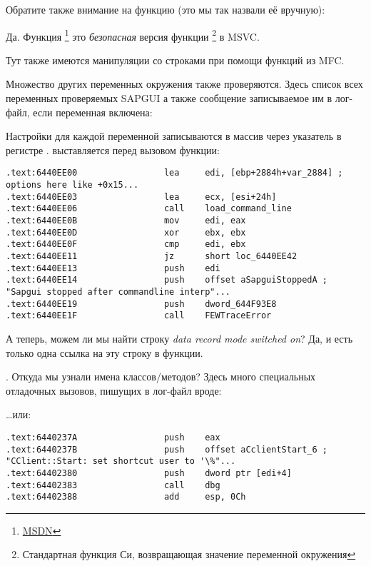 Обратите также внимание на функцию  (это мы так назвали её вручную):



Да. Функция \footnote{\href{http://msdn.microsoft.com/en-us/library/tb2sfw2z(VS.80).aspx}{MSDN}} 
это \emph{безопасная} версия функции \footnote{Стандартная функция Си,
возвращающая значение переменной окружения} в MSVC.

Тут также имеются манипуляции со строками при помощи функций из MFC.

Множество других переменных окружения также проверяются. Здесь список всех переменных проверяемых SAPGUI 
а также сообщение записываемое им в лог-файл, если переменная включена:



Настройки для каждой переменной записываются в массив через указатель в регистре \EDI.
\EDI выставляется перед вызовом функции:

\begin{lstlisting}[style=customasmx86]
.text:6440EE00                 lea     edi, [ebp+2884h+var_2884] ; options here like +0x15...
.text:6440EE03                 lea     ecx, [esi+24h]
.text:6440EE06                 call    load_command_line
.text:6440EE0B                 mov     edi, eax
.text:6440EE0D                 xor     ebx, ebx
.text:6440EE0F                 cmp     edi, ebx
.text:6440EE11                 jz      short loc_6440EE42
.text:6440EE13                 push    edi
.text:6440EE14                 push    offset aSapguiStoppedA ; "Sapgui stopped after commandline interp"...
.text:6440EE19                 push    dword_644F93E8
.text:6440EE1F                 call    FEWTraceError
\end{lstlisting}

А теперь, можем ли мы найти строку \emph{data record mode switched on}?
Да, и есть только одна ссылка на эту строку в функции.

\par {}.
Откуда мы узнали имена классов/методов? Здесь много специальных отладочных вызовов, пишущих в лог-файл вроде:



\dots или:

\begin{lstlisting}[style=customasmx86]
.text:6440237A                 push    eax
.text:6440237B                 push    offset aCclientStart_6 ; "CClient::Start: set shortcut user to '\%"...
.text:64402380                 push    dword ptr [edi+4]
.text:64402383                 call    dbg
.text:64402388                 add     esp, 0Ch
\end{lstlisting}


